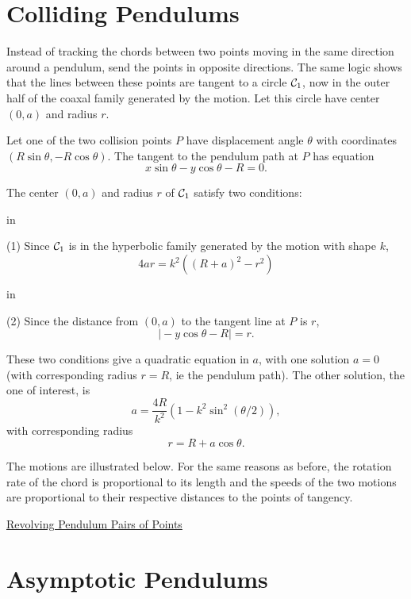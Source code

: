 \documentclass{ximera}
\newcommand{\pskip}{\vskip 0.1 in}
\begin{document}
\section*{Colliding Pendulums}
Instead of tracking the chords between two points moving in the same direction around a pendulum, send the points in opposite directions. The same logic shows that the lines between these points are tangent to a circle ${\cal C}_1$, now  in the outer half of the coaxal family generated by the motion. Let this circle have center $(0,a)$ and radius $r$.

Let one of the two collision points $P$ have displacement angle $\theta$ with coordinates $(R\sin\theta, -R \cos\theta)$. The tangent to the pendulum path at $P$ has equation
\[
       x\sin \theta - y\cos\theta - R = 0.
\]

The center $(0,a)$ and radius $r$ of ${\cal C}_1$ satisfy two conditions:

\pskip

(1) Since ${\cal C}_1$ is in the hyperbolic family generated by the motion with shape $k$,
\[
      4ar = k^2 \left(  (R+a)^2 - r^2   \right)
\]

\pskip

(2) Since the distance from $(0,a)$ to the tangent line at $P$ is $r$, 
\[
     \Big|  -y \cos \theta - R  \Big| = r .
\] 

These two conditions give a quadratic equation in $a$, with one solution $a=0$ (with corresponding radius $r=R$, ie the pendulum path). The other solution, the one of interest, is
\[
     a = \frac{4R}{k^2} \left( 1 - k^2 \sin^2 (\theta/2)    \right) ,
\]
with corresponding radius
\[
  r = R + a\cos \theta .
\]

The motions are illustrated below. For the same reasons as before, the rotation rate of the chord is proportional to its length and the speeds of the two motions are proportional to their respective distances to the points of tangency.

\begin{onlineOnly}
    \begin{center}
\end{center}
\end{onlineOnly}

\href{https://www.desmos.com/calculator/5vecnkcwou}{Revolving Pendulum Pairs of Points}


\section*{Asymptotic Pendulums}
\end{document}
